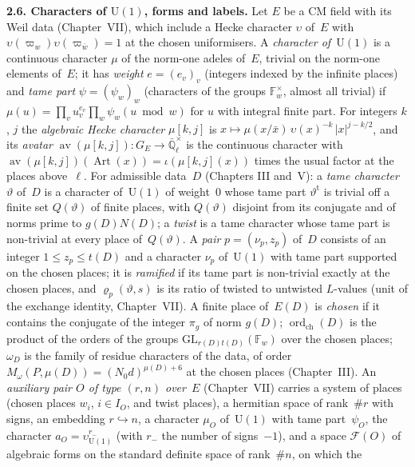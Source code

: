 \documentclass[11pt,a4paper]{article}
\newcommand{\F}{\mathbb{F}}
\newcommand{\m}[1]{\mbox{$#1$}}        %
\newcommand{\subhead}[1]{\par\addvspace{9pt plus 2pt}\Needspace{4\baselineskip}\noindent\textbf{#1}\enspace\ignorespaces}
\theoremstyle{plainx}
\theoremstyle{uprightx}
\newcommand{\Qlb}{\bar{\mathbb{Q}}_\ell}
\newcommand{\GE}[1]{G_{#1}}
\newcommand{\cj}[1]{\bar{#1}}
\newcommand{\GL}{\mathrm{GL}}
\newcommand{\Art}{\operatorname{Art}}
\newcommand{\av}{\operatorname{av}}
\newcommand{\Dr}[1]{r(#1)}
\newcommand{\tD}[1]{t(#1)}
\newcommand{\ED}[1]{E(#1)}
\newcommand{\gD}[1]{g(#1)}
\newcommand{\lvl}[1]{N(#1)}
\newcommand{\ordch}[1]{\operatorname{ord}_{\mathrm{ch}}(#1)}
\newcommand{\Dmu}[1]{\mu(#1)}
\newcommand{\Mom}[2]{M_\omega(#1,#2)}           %
\begin{document}
\subhead{2.6. Characters of $\mathrm{U}(1)$, forms and labels.} Let $E$ be a CM field with its Weil data
(Chapter~VII), which include a Hecke character $\upsilon$ of~$E$ with \m{\upsilon(\varpi_w)\upsilon(\varpi_{\cj w})=1}
at the chosen uniformisers. A \emph{character of~$\mathrm{U}(1)$} is a continuous character $\mu$ of the norm-one
adeles of~$E$, trivial on the norm-one elements of~$E$; it has \emph{weight} \m{e=(e_v)_v} (integers indexed by the
infinite places) and \emph{tame part} \m{\psi=(\psi_w)_w} (characters of the groups \m{\F_w^{\times}}, almost all
trivial) if \m{\mu(u)=\prod_v u_v^{e_v}\prod_w\psi_w(u\bmod w)} for $u$ with integral finite part. For integers $k$,
$j$ the \emph{algebraic Hecke character} \m{\mu[k,j]} is \m{x\mapsto\mu(x/\cj{x})\,\upsilon(x)^{-k}\,|x|^{j-k/2}}, and its
\emph{avatar} \m{\av(\mu[k,j])\colon\GE{E}\to\Qlb^{\times}} is the continuous character with
\m{\av(\mu[k,j])(\Art(x))=\iota(\mu[k,j](x))} times the usual factor at the places above~$\ell$. For admissible
data~$D$ (Chapters III and~V): a \emph{tame character} $\vartheta$ of~$D$ is a character of~$\mathrm{U}(1)$ of
weight~$0$ whose tame part \m{\vartheta^{\mathrm{t}}} is trivial off a finite set \m{Q(\vartheta)} of finite places, with
\m{Q(\vartheta)} disjoint from its conjugate and of norms prime to \m{\gD{D}\lvl{D}}; a \emph{twist} is a tame character
whose tame part is non-trivial at every place of~\m{Q(\vartheta)}. A \emph{pair} \m{p=(\nu_p,z_p)} of~$D$ consists of an
integer \m{1\le z_p\le\tD{D}} and a character $\nu_p$ of~$\mathrm{U}(1)$ with tame part supported on the chosen places;
it is \emph{ramified} if its tame part is non-trivial exactly at the chosen places, and \m{\varrho_p(\vartheta,s)} is
its ratio of twisted to untwisted $L$-values (unit of the exchange identity, Chapter~VII). A finite place of~\m{\ED{D}} is
\emph{chosen} if it contains the conjugate of the integer \m{\pi_g} of norm \m{\gD{D}}; \m{\ordch{D}} is the product
of the orders of the groups \m{\GL_{\Dr{D}\tD{D}}(\F_w)} over the chosen places; \m{\omega_D} is the family of
residue characters of the data, of order \m{\Mom{P}{\Dmu{D}}=(N_0d)^{\Dmu{D}+6}} at the chosen places (Chapter~III). An \emph{auxiliary pair $O$ of type
\m{(r,n)} over~$E$} (Chapter~VII) carries a system of places (chosen places \m{w_i}, \m{i\in I_O}, and twist places),
a hermitian space of rank~\m{\#r} with signs, an embedding \m{r\hookrightarrow n}, a character $\mu_O$ of~$\mathrm{U}(1)$
with tame part~$\psi_O$, the character \m{a_O=\upsilon_{\mathrm{U}(1)}^{r_-}} (with $r_-$ the number of signs~$-1$),
and a space \m{\mathcal{F}(O)} of algebraic forms on the standard definite space of rank~\m{\#n}, on which the
\end{document}
